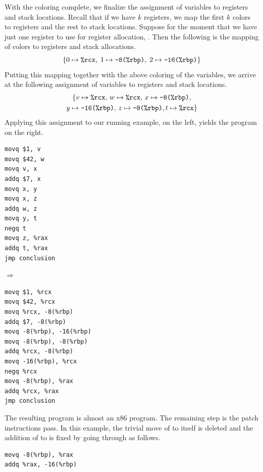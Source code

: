 \documentclass[11pt]{book}
\begin{document}
With the coloring complete, we finalize the assignment of variables to
registers and stack locations. Recall that if we have $k$ registers,
we map the first $k$ colors to registers and the rest to stack
locations.  Suppose for the moment that we have just one register to
use for register allocation, . Then the following is the
mapping of colors to registers and stack allocations.
\[
  \{ 0 \mapsto \texttt{\%rcx}, \; 1 \mapsto \texttt{-8(\%rbp)}, \; 2 \mapsto \texttt{-16(\%rbp)} \}
\]
Putting this mapping together with the above coloring of the
variables, we arrive at the following assignment of variables to
registers and stack locations.
\begin{gather*}
  \{ v \mapsto \texttt{\%rcx}, \,
     w \mapsto \texttt{\%rcx},  \,
     x \mapsto \texttt{-8(\%rbp)}, \\
     y \mapsto \texttt{-16(\%rbp)},  \,
     z\mapsto \texttt{-8(\%rbp)}, 
     t\mapsto \texttt{\%rcx} \}
\end{gather*}
Applying this assignment to our running example, on the left, yields
the program on the right.
\begin{center}
  \begin{minipage}{0.3\textwidth}
\begin{lstlisting}
movq $1, v
movq $42, w
movq v, x
addq $7, x
movq x, y
movq x, z
addq w, z
movq y, t
negq t
movq z, %rax
addq t, %rax
jmp conclusion
\end{lstlisting}
\end{minipage}
$\Rightarrow\qquad$
\begin{minipage}{0.45\textwidth}
\begin{lstlisting}
movq $1, %rcx
movq $42, %rcx
movq %rcx, -8(%rbp)
addq $7, -8(%rbp)
movq -8(%rbp), -16(%rbp)
movq -8(%rbp), -8(%rbp)
addq %rcx, -8(%rbp)
movq -16(%rbp), %rcx
negq %rcx
movq -8(%rbp), %rax
addq %rcx, %rax
jmp conclusion
\end{lstlisting}
\end{minipage}
\end{center}

The resulting program is almost an x86 program. The remaining step is
the patch instructions pass. In this example, the trivial move of
 to itself is deleted and the addition of
 to  is fixed by going through
 as follows.
\begin{lstlisting}
movq -8(%rbp), %rax
addq %rax, -16(%rbp)
\end{lstlisting}
\end{document}
